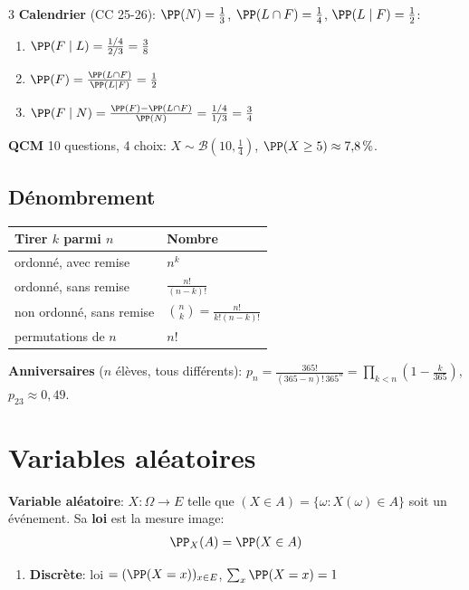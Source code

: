 \documentclass[12pt, a4paper]{article}
\begin{document}
\begin{multicols*}{3}
	\textbf{Calendrier} (CC 25-26): $\PP(N)=\frac13$, $\PP(L\cap F)=\frac14$, $\PP(L\mid F)=\frac12$:
	\begin{enumerate}[\roman*.]
		\item $\PP(F\mid L)=\frac{1/4}{2/3}=\frac38$
		\item $\PP(F)=\frac{\PP(L\cap F)}{\PP(L\mid F)}=\frac12$
		\item $\PP(F\mid N)=\frac{\PP(F)-\PP(L\cap F)}{\PP(N)}=\frac{1/4}{1/3}=\frac34$
	\end{enumerate}

	\textbf{QCM} 10 questions, 4 choix: $X\sim\mathcal B(10,\frac14)$, $\PP(X\geq5)\approx7{,}8\,\%$.

	\subsection{Dénombrement}
	\begin{tabular}{|l|l|}
		\hline
		\textbf{Tirer $k$ parmi $n$}       & \textbf{Nombre}                 \\
		\hline
		ordonné, avec remise           & $n^k$                           \\
		ordonné, sans remise           & $\frac{n!}{(n-k)!}$             \\
		non ordonné, sans remise       & $\binom nk=\frac{n!}{k!(n-k)!}$ \\
		permutations de $n$            & $n!$                            \\
		\hline
	\end{tabular}

	\textbf{Anniversaires} ($n$ élèves, tous différents): $p_n=\frac{365!}{(365-n)!\,365^n}=\prod_{k<n}(1-\frac k{365})$, $p_{23}\approx0{,}49$.


	\colbreak
	\section{Variables aléatoires}
	\textbf{Variable aléatoire}: $X:\Omega\to E$ telle que $(X\in A)=\{\omega:X(\omega)\in A\}$ soit un événement. Sa \textbf{loi} est la mesure image:
	\begin{gather*}
		\PP_X(A)=\PP(X\in A)
	\end{gather*}
	\begin{enumerate}[\roman*.]
		\item \textbf{Discrète}: loi $=(\PP(X=x))_{x\in E}$, $\sum_x\PP(X=x)=1$
	\end{enumerate}


\end{multicols*}
\end{document}
